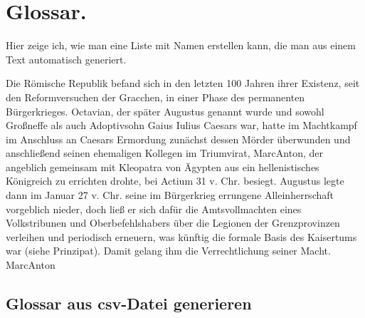 
\chapter{Glossar.} 
Hier zeige ich, wie man eine Liste mit Namen erstellen kann, die man aus einem Text automatisch generiert.


Die Römische Republik befand sich in den letzten 100 Jahren ihrer Existenz, seit den Reformversuchen der Gracchen, in einer Phase des permanenten Bürgerkrieges. Octavian, der später \gls{Augustus} genannt wurde und sowohl Großneffe als auch Adoptivsohn Gaius Iulius Caesars war, hatte im Machtkampf im Anschluss an Caesars Ermordung zunächst dessen Mörder überwunden und anschließend seinen ehemaligen Kollegen im Triumvirat, \gls{MarcAnton}, der angeblich gemeinsam mit Kleopatra von Ägypten aus ein hellenistisches Königreich zu errichten drohte, bei Actium 31 v. Chr. besiegt. \gls{Augustus} legte dann im Januar 27 v. Chr. seine im Bürgerkrieg errungene Alleinherrschaft vorgeblich nieder, doch ließ er sich dafür die Amtsvollmachten eines Volkstribunen und Oberbefehlshabers über die Legionen der Grenzprovinzen verleihen und periodisch erneuern, was künftig die formale Basis des Kaisertums war (siehe Prinzipat). Damit gelang ihm die Verrechtlichung seiner Macht. \gls{MarcAnton}

\printglossary[%
title={Namen der antiken Kaiser},
style=index]

\section{Glossar aus csv-Datei generieren}


